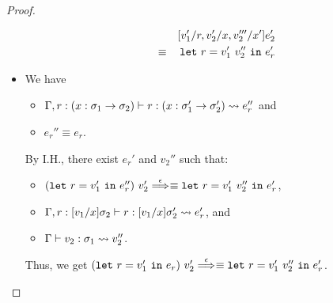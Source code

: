 \begin{proof}
\begin{itemize}
\begin{eqnarray*}
&&[v_1'/r,v_2'/x,v_2'''/x']e_2' \\
%
&\equiv& \LETEQIN{r}{v_1'\ v_2''}e_r'
\end{eqnarray*}


\item[] 
We have
\begin{itemize}
\item \(\Gamma,r:(x:\sigma_1 \to \sigma_2) \vdash r : (x:\sigma_1' \to \sigma_2') \leadsto e_r''\) and
\item \(e_r'' \equiv e_r\).
\end{itemize}
By I.H., there exist \(e_r'\) and \(v_2''\) such that:
\begin{itemize}
\item \((\mathtt{let~}r=v_1'\mathtt{~in~}{e_r''})\ v_2' \stackrel{\epsilon}{\Longrightarrow}_{}\equiv \mathtt{let~}r=v_1'\ v_2''\mathtt{~in~}e_r'\),
\item \(\Gamma,r:[v_1/x]\sigma_2 \vdash r : [v_1/x]\sigma_2' \leadsto e_r'\), and
\item \(\Gamma \vdash v_2 : \sigma_1 \leadsto v_2''\).
\end{itemize}
Thus, we get
\((\mathtt{let~}r=v_1'\mathtt{~in~}{e_r})\ v_2' \stackrel{\epsilon}{\Longrightarrow}_{}\equiv \mathtt{let~}r=v_1'\ v_2''\mathtt{~in~}e_r'\).

\end{itemize}
\end{proof}

